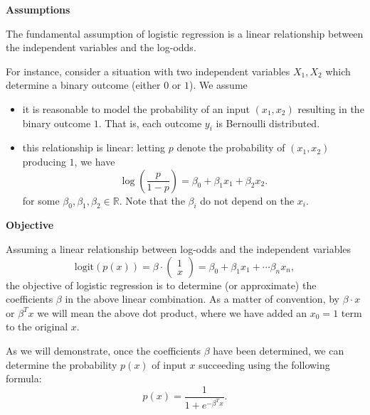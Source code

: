 \documentclass[12pt]{article}
\begin{document}
\textbf{Assumptions}

The fundamental assumption of logistic regression is a linear relationship between the independent variables and the log-odds. 

For instance, consider a situation with two independent variables $X_1,X_2$ which determine a binary outcome (either $0$ or $1$). We assume 
\begin{itemize}
	\item it is reasonable to model the probability of an input $(x_1,x_2)$ resulting in the binary outcome $1$. That is, each outcome $y_i$ is Bernoulli distributed. 
	\item this relationship is linear: letting $p$ denote the probability of $(x_1,x_2)$ producing $1$, we have 
		\begin{equation*}
			\log\left(\frac{p}{1-p}\right) = \beta_0 + \beta_1x_1 + \beta_2x_2.
		\end{equation*}
		for some $\beta_0,\beta_1,\beta_2\in\mathbb{R}$. Note that the $\beta_i$ do not depend on the $x_i$.
\end{itemize}

\textbf{Objective}

Assuming a linear relationship between log-odds and the independent variables 
\begin{equation*}
	\text{logit}(p(x)) = \beta \cdot \begin{pmatrix} 1 \\ x \end{pmatrix} = \beta_0 + \beta_1x_1 + \cdots \beta_nx_n,
\end{equation*}
the objective of logistic regression is to determine (or approximate) the coefficients $\beta$ in the above linear combination. As a matter of convention, by $\beta\cdot x$ or $\beta^Tx$ we will mean the above dot product, where we have added an $x_0=1$ term to the original $x$.

As we will demonstrate, once the coefficients $\beta$ have been determined, we can determine the probability $p(x)$ of input $x$ succeeding using the following formula:
\begin{equation*}
	p(x) = \frac{1}{1+e^{-\beta^Tx}}.
\end{equation*}


\end{document}
